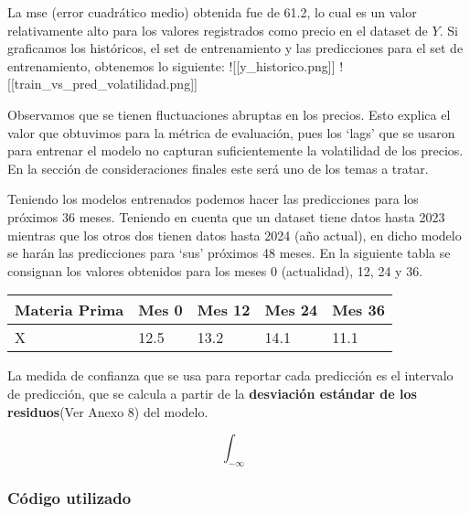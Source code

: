 La mse (error cuadrático medio) obtenida fue de 61.2, lo cual es un
valor relativamente alto para los valores registrados como precio en el
dataset de \(Y\). Si graficamos los históricos, el set de entrenamiento
y las predicciones para el set de entrenamiento, obtenemos lo siguiente:
!{[}{[}y\_historico.png{]}{]}
!{[}{[}train\_vs\_pred\_volatilidad.png{]}{]}

Observamos que se tienen fluctuaciones abruptas en los precios. Esto
explica el valor que obtuvimos para la métrica de evaluación, pues los
`lags' que se usaron para entrenar el modelo no capturan suficientemente
la volatilidad de los precios. En la sección de consideraciones finales
este será uno de los temas a tratar.

Teniendo los modelos entrenados podemos hacer las predicciones para los
próximos 36 meses. Teniendo en cuenta que un dataset tiene datos hasta
2023 mientras que los otros dos tienen datos hasta 2024 (año actual), en
dicho modelo se harán las predicciones para `sus' próximos 48 meses. En
la siguiente tabla se consignan los valores obtenidos para los meses 0
(actualidad), 12, 24 y 36.

\begin{longtable}[]{@{}lllll@{}}
\toprule\noalign{}
Materia Prima & Mes 0 & Mes 12 & Mes 24 & Mes 36 \\
\midrule\noalign{}
\endhead
\bottomrule\noalign{}
\endlastfoot
X & 12.5 & 13.2 & 14.1 & 11.1 \\
\end{longtable}

La medida de confianza que se usa para reportar cada predicción es el
intervalo de predicción, que se calcula a partir de la
\textbf{desviación estándar de los residuos}(Ver Anexo 8) del modelo.

\[
\int_{-\infty}
\]

\subsubsection{Código utilizado}\label{cuxf3digo-utilizado}

\begin{Shaded}
\begin{Highlighting}[]
\OperatorTok{=}\OperatorTok{=}\NormalTok{(}\NormalTok{,}\NormalTok{,}\NormalTok{))}
\OperatorTok{=}
\OperatorTok{=}\OperatorTok{=}\NormalTok{)}
\end{Highlighting}
\end{Shaded}

